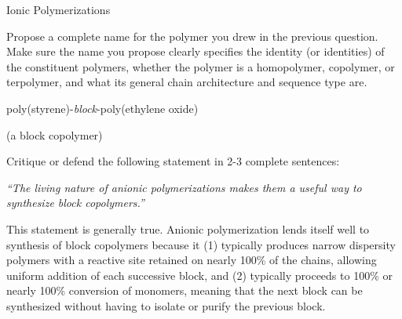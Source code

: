 \begin{activity}{Ionic Polymerizations}
\begin{ctqs}
	\question Propose a complete name for the polymer you drew in the previous question.  Make sure the name you propose clearly specifies the identity (or identities) of the constituent polymers, whether the polymer is a homopolymer, copolymer, or terpolymer, and what its general chain architecture and sequence type are. 
	
		\begin{solution}[1in]
			poly(styrene)-\emph{block}-poly(ethylene oxide)
			
			(a block copolymer)
		\end{solution}
		
	\question Critique or defend the following statement in 2-3 complete sentences:
	
		\emph{``The living nature of anionic polymerizations makes them a useful way to synthesize block copolymers.''}
		
		\begin{solution}[1.5in]
			This statement is generally true.  Anionic polymerization lends itself well to synthesis of block copolymers because it (1) typically produces narrow dispersity polymers with a reactive site retained on nearly 100\% of the chains, allowing uniform addition of each successive block, and (2) typically proceeds to 100\% or nearly 100\% conversion of monomers, meaning that the next block can be synthesized without having to isolate or purify the previous block.
		\end{solution}
	
\end{ctqs}




	


%
%	


	
\end{activity}